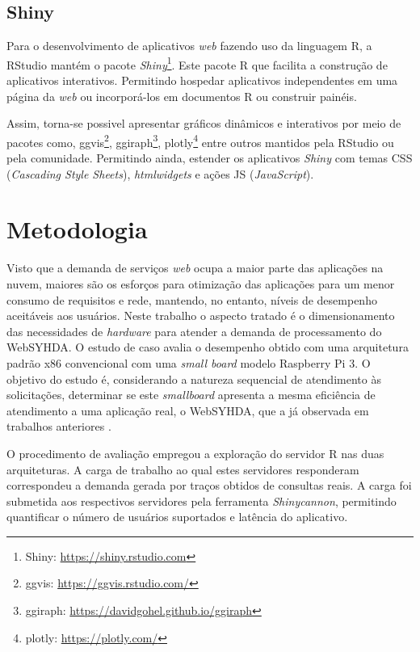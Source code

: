\documentclass[12pt,english,brazil]{article}
\begin{document}
\subsection{Shiny} \label{sec:Shiny}

Para o desenvolvimento de aplicativos \emph{web} fazendo uso da linguagem R, a RStudio mantém o pacote \emph{Shiny}\footnote{Shiny: \url{https://shiny.rstudio.com}}. Este pacote R que facilita a construção de aplicativos interativos. Permitindo hospedar aplicativos independentes em uma página da \emph{web} ou incorporá-los em documentos R  ou construir painéis. 

Assim, torna-se possivel apresentar gráficos dinâmicos e interativos por meio de pacotes como, ggvis\footnote{ggvis: \url{https://ggvis.rstudio.com/}}, ggiraph\footnote{ggiraph: \url{https://davidgohel.github.io/ggiraph}}, plotly\footnote{plotly: \url{https://plotly.com/}} entre outros mantidos pela RStudio ou pela comunidade. Permitindo ainda, estender os aplicativos \emph{Shiny} com temas CSS (\emph{Cascading Style Sheets}), \emph{htmlwidgets} e ações JS (\emph{JavaScript}).


\section{Metodologia} \label{sec:metodologia}

Visto que a demanda de serviços \textit{web} ocupa a maior parte das aplicações na nuvem, maiores são os esforços para otimização das aplicações para um menor consumo de requisitos e rede, mantendo, no entanto, níveis de desempenho aceitáveis aos usuários. Neste trabalho o aspecto tratado é o dimensionamento das necessidades de \emph{hardware} para atender a demanda de processamento do WebSYHDA. O estudo de caso avalia o desempenho obtido com uma arquitetura padrão x86 convencional com uma \emph{small board} modelo Raspberry Pi 3. O objetivo do estudo é, considerando a natureza sequencial de atendimento às solicitações, determinar se este \emph{smallboard} apresenta a mesma eficiência de atendimento a uma aplicação real, o WebSYHDA, que a já observada em trabalhos anteriores  \cite{silva2019estudo}.

O procedimento de avaliação empregou a exploração do servidor R nas duas arquiteturas. A carga de trabalho ao qual estes servidores responderam correspondeu a demanda gerada por traços obtidos de consultas reais. A carga foi submetida aos respectivos servidores pela  ferramenta \emph{Shinycannon}, permitindo quantificar o número de usuários suportados e latência do aplicativo.
\end{document}
